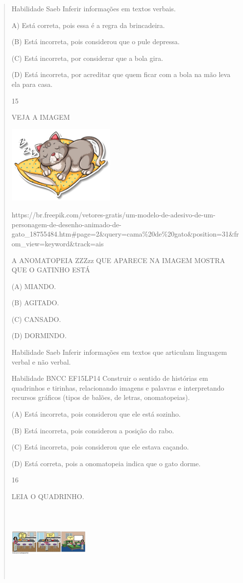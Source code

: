 \begin{verse}
{{{{{{{{{{{{{{{{{{{{Habilidade Saeb Inferir informações em textos verbais.

A) Está correta, pois essa é a regra da brincadeira.

(B) Está incorreta, pois considerou que o pule depressa.

(C) Está incorreta, por considerar que a bola gira.

(D) Está incorreta, por acreditar que quem ficar com a bola na mão leva
ela para casa.

\num{15}

VEJA A IMAGEM

\includegraphics[width=2.09091in,height=1.52916in]{media/image161.jpeg}

https://br.freepik.com/vetores-gratis/um-modelo-de-adesivo-de-um-personagem-de-desenho-animado-de-gato\_18755484.htm\#page=2\&query=cama\%20de\%20gato\&position=31\&from\_view=keyword\&track=ais

A ANOMATOPEIA ZZZzz QUE APARECE NA IMAGEM MOSTRA QUE O GATINHO ESTÁ

(A) MIANDO.

(B) AGITADO.

(C) CANSADO.

(D) DORMINDO.

Habilidade Saeb Inferir informações em textos que articulam linguagem
verbal e não verbal.

Habilidade BNCC EF15LP14 Construir o sentido de histórias em quadrinhos
e tirinhas, relacionando imagens e palavras e interpretando recursos
gráficos (tipos de balões, de letras, onomatopeias).

(A) Está incorreta, pois considerou que ele está sozinho.

(B) Está incorreta, pois considerou a posição do rabo.

(C) Está incorreta, pois considerou que ele estava caçando.

(D) Está correta, pois a onomatopeia indica que o gato dorme.

\num{16}

LEIA O QUADRINHO.

\includegraphics[width=1.57333in,height=1.45456in]{media/image162.png}

}}}}}}}}}}}}}}}}}}}}
\end{verse}

